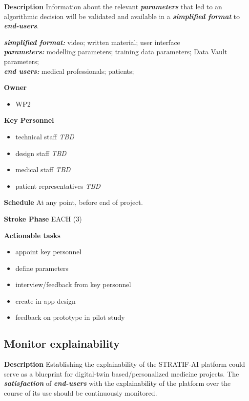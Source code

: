 \documentclass[
  letterpaper,
  DIV=11,
  numbers=noendperiod]{scrreport}
\providecommand{\tightlist}{%
  \setlength{\itemsep}{0pt}\setlength{\parskip}{0pt}}\usepackage{longtable,booktabs,array}
\begin{document}
\textbf{Description} Information about the relevant
\textbf{\emph{parameters}} that led to an algorithmic decision will be
validated and available in a \textbf{\emph{simplified format}} to
\textbf{\emph{end-users}}.

\textbf{\emph{simplified format:}} video; written material; user
interface\\
\textbf{\emph{parameters:}} modelling parameters; training data
parameters; Data Vault parameters;\\
\textbf{\emph{end users:}} medical professionals; patients;

\textbf{Owner}

\begin{itemize}
\tightlist
\item
  WP2
\end{itemize}

\textbf{Key Personnel}

\begin{itemize}
\tightlist
\item
  technical staff \emph{TBD}
\item
  design staff \emph{TBD}
\item
  medical staff \emph{TBD}
\item
  patient representatives \emph{TBD}
\end{itemize}

\textbf{Schedule} At any point, before end of project.

\textbf{Stroke Phase} EACH (3)

\textbf{Actionable tasks}

\begin{itemize}
\tightlist
\item
  appoint key personnel
\item
  define parameters
\item
  interview/feedback from key personnel
\item
  create in-app design
\item
  feedback on prototype in pilot study
\end{itemize}

\hypertarget{monitor-explainability}{%
\subsection{Monitor explainability}\label{monitor-explainability}}

\textbf{Description} Establishing the explainability of the STRATIF-AI
platform could serve as a blueprint for digital-twin based/personalized
medicine projects. The \textbf{\emph{satisfaction}} of
\textbf{\emph{end-users}} with the explainability of the platform over
the course of its use should be continuously monitored.
\end{document}
